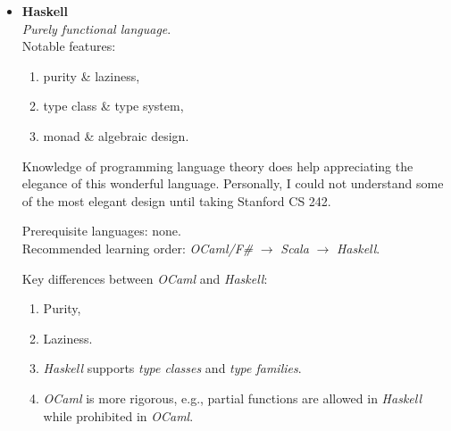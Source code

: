 \documentclass{article}
\begin{document}
\begin{itemize}
    \item \textbf{Haskell}\\
    \emph{Purely functional language}.\\

    Notable features:
    \begin{enumerate}
        \item purity \& laziness,
        \item type class \& type system,
        \item monad \& algebraic design.
    \end{enumerate}
    
    Knowledge of programming language theory does help appreciating the elegance of this wonderful language. Personally, I could not understand some of the most elegant design until taking Stanford CS 242.
    
    Prerequisite languages: none.\\
    Recommended learning order:
    \emph{OCaml/F\#} $\rightarrow$ \emph{Scala} $\rightarrow$ \emph{Haskell}.
    
    Key differences between \emph{OCaml} and \emph{Haskell}:
    \begin{enumerate}
        \item Purity,
        \item Laziness.
        \item \emph{Haskell} supports \emph{type classes} and \emph{type families}.
        \item \emph{OCaml} is more rigorous, e.g., partial functions are allowed in \emph{Haskell} while prohibited in \emph{OCaml}.
    \end{enumerate}
    

\end{itemize}
\end{document}
